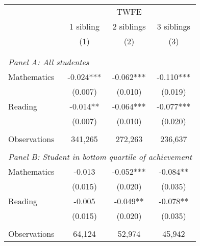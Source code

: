 \makeatletter
{}
{
\makeatother
\begin{tabular}{lccc}
\toprule
\cmidrule(lr){2-4}
& \multicolumn{3}{c}{TWFE} \\
\cmidrule(lr){2-4}
& 1 sibling & 2 siblings & 3 siblings  \\
\cmidrule(lr){2-2} \cmidrule(lr){3-3} \cmidrule(lr){4-4}
& (1) & (2) & (3)\\
\bottomrule
&  &  &  \\
&  &  &   \\
\multicolumn{4}{l}{\textit{Panel A: All studentes}} \\
\hspace{3mm}Mathematics&      -0.024***&      -0.062***&      -0.110***\\
                    &     (0.007)   &     (0.010)   &     (0.019)   \\
 
\hspace{3mm}Reading &      -0.014** &      -0.064***&      -0.077***\\
                    &     (0.007)   &     (0.010)   &     (0.020)   \\
                    &               &               &               \\
\hspace{3mm}Observations&     341,265   &     272,263   &     236,637   \\
 
&  &  &   \\
\multicolumn{4}{l}{\textit{Panel B: Student in bottom quartile of achievement}} \\
\hspace{3mm}Mathematics&      -0.013   &      -0.052***&      -0.084** \\
                    &     (0.015)   &     (0.020)   &     (0.035)   \\
 
\hspace{3mm}Reading &      -0.005   &      -0.049** &      -0.078** \\
                    &     (0.015)   &     (0.020)   &     (0.035)   \\
                    &               &               &               \\
\hspace{3mm}Observations&      64,124   &      52,974   &      45,942   \\
 

\end{tabular}}
